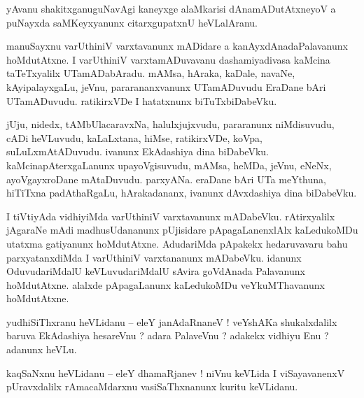 \documentclass{article}
\begin{document}
\begin{mn}%
yAvanu shakitxganuguNavAgi kaneyxge alaMkarisi dAnamADutAtxneyoV a puNayxda saMKeyxyanunx 
citarxgupatxnU heVLalAranu.
\end{mn}

\begin{mn}%
manuSayxnu varUthiniV varxtavanunx mADidare a kanAyxdAnadaPalavanunx hoMdutAtxne. I varUthiniV 
varxtamADuvavanu dashamiyadivasa kaMcina taTeTxyalilx UTamADabAradu. mAMsa, hAraka, kaDale, 
navaNe, kAyipalayxgaLu, jeVnu, pararananxvanunx UTamADuvudu EraDane bAri UTamADuvudu. ratikirxVDe 
I hatatxnunx biTuTxbiDabeVku.
\end{mn}

\begin{mn}%
jUju, nidedx, tAMbUlacaravxNa, halulxjujxvudu, pararanunx niMdisuvudu, cADi heVLuvudu, kaLaLxtana, 
hiMse, ratikirxVDe, koVpa, suLuLxmAtADuvudu. ivanunx EkAdashiya dina biDabeVku. 
kaMcinapAterxgaLanunx upayoVgisuvudu, mAMsa, heMDa, jeVnu, eNeNx, ayoVgayxroDane mAtaDuvudu. 
parxyANa. eraDane bAri UTa meYthuna, hiTiTxna padAthaRgaLu, hArakadananx, ivanunx dAvxdashiya dina 
biDabeVku.
\end{mn}

\begin{mn}%
I tiVtiyAda vidhiyiMda varUthiniV varxtavanunx mADabeVku. rAtirxyalilx jAgaraNe mAdi 
madhusUdananunx pUjisidare pApagaLanenxlAlx kaLedukoMDu utatxma gatiyanunx hoMdutAtxne. AdudariMda 
pApakekx hedaruvavaru bahu parxyatanxdiMda I varUthiniV varxtananunx mADabeVku. idanunx 
OduvudariMdalU keVLuvudariMdalU sAvira goVdAnada Palavanunx hoMdutAtxne. alalxde pApagaLanunx 
kaLedukoMDu veYkuMThavanunx hoMdutAtxne.
\end{mn}


\begin{mn}%
yudhiSiThxranu heVLidanu -- eleY janAdaRnaneV ! veYshAKa shukalxdalilx baruva EkAdashiya hesareVnu 
? adara PalaveVnu ? adakekx vidhiyu Enu ? adanunx heVLu.
\end{mn}

\begin{mn}%
kaqSaNxnu heVLidanu -- eleY dhamaRjanev ! niVnu keVLida I viSayavanenxV pUravxdalilx rAmacaMdarxnu 
vasiSaThxnanunx kuritu keVLidanu.
\end{mn}
\end{document}
